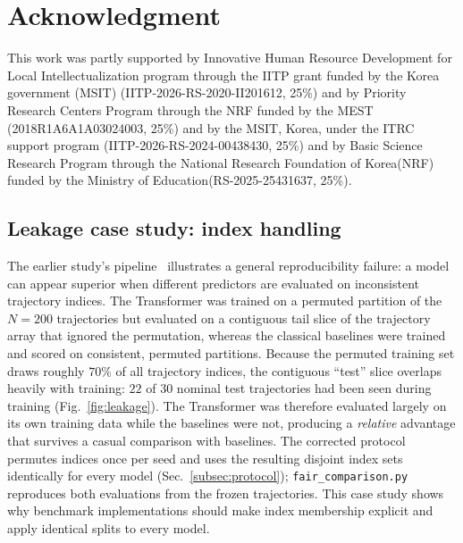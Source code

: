 \documentclass[pdflatex,sn-mathphys-num]{sn-jnl}
\theoremstyle{thmstyleone}%
\theoremstyle{thmstyletwo}%
\theoremstyle{thmstylethree}%
\begin{document}
\vspace{-0.2cm}
\small
\section *{Acknowledgment } 
This work was partly supported by Innovative Human Resource Development for Local Intellectualization program through the IITP grant funded by the Korea government (MSIT) (IITP-2026-RS-2020-II201612, 25\%) and by Priority Research Centers Program through the NRF funded by the MEST (2018R1A6A1A03024003, 25\%) and by the MSIT, Korea, under the ITRC support program (IITP-2026-RS-2024-00438430, 25\%) and by Basic Science Research Program through the National Research Foundation of Korea(NRF) funded by the Ministry of Education(RS-2025-25431637, 25\%).

\begin{appendices}

\section{Leakage case study: index handling}
\label{app:leakage}

The earlier study's pipeline~\cite{kanu2026transformer} illustrates a general reproducibility failure: a model can appear superior when different predictors are evaluated on inconsistent trajectory indices. The Transformer was trained on a permuted partition of the $N=200$ trajectories but evaluated on a contiguous tail slice of the trajectory array that ignored the permutation, whereas the classical baselines were trained and scored on consistent, permuted partitions. Because the permuted training set draws roughly $70\%$ of all trajectory indices, the contiguous ``test'' slice overlaps heavily with training: $22$ of $30$ nominal test trajectories had been seen during training (Fig.~\ref{fig:leakage}). The Transformer was therefore evaluated largely on its own training data while the baselines were not, producing a \emph{relative} advantage that survives a casual comparison with baselines. The corrected protocol permutes indices once per seed and uses the resulting disjoint index sets identically for every model (Sec.~\ref{subsec:protocol}); \texttt{fair\_comparison.py} reproduces both evaluations from the frozen trajectories. This case study shows why benchmark implementations should make index membership explicit and apply identical splits to every model.


\end{appendices}
\end{document}
